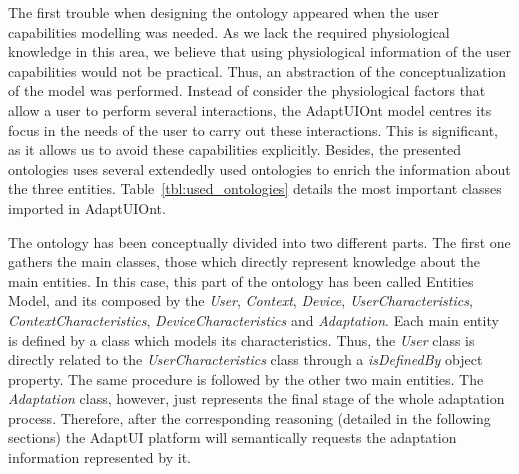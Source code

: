 The first trouble when designing the ontology appeared when the user capabilities
modelling was needed. As we lack the required physiological knowledge in this area,
we believe that using physiological information of the user capabilities would
not be practical. Thus, an abstraction of the conceptualization of the model was
performed. Instead of consider the physiological factors that allow a user to
perform several interactions, the AdaptUIOnt model centres its focus in the needs
of the user to carry out these interactions. This is significant, as it allows
us to avoid these capabilities explicitly. Besides, the presented ontologies
uses several extendedly used ontologies to enrich the information about the three
entities. Table~\ref{tbl:used_ontologies} details the most important classes
imported in AdaptUIOnt.

The ontology has been conceptually divided into two different parts. The first
one gathers the main classes, those which directly represent knowledge about
the main entities. In this case, this part of the ontology has been called
Entities Model, and its composed by the \textit{User}, \textit{Context},
\textit{Device}, \textit{UserCharacteristics}, \textit{ContextCharacteristics},
\textit{DeviceCharacteristics} and \textit{Adaptation}. Each main entity is
defined by a class which models its characteristics. Thus, the \textit{User}
class is directly related to the \textit{UserCharacteristics} class through a
\textit{isDefinedBy} object property. The same procedure is followed by the other
two main entities. The \textit{Adaptation} class, however, just represents the
final stage of the whole adaptation process. Therefore, after the corresponding
reasoning (detailed in the following sections) the AdaptUI platform will
semantically requests the adaptation information represented by it.
